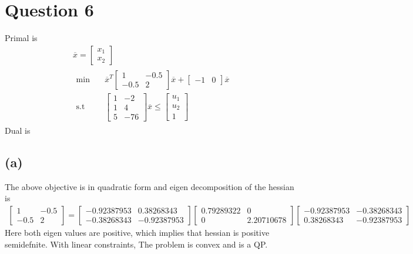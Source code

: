 \documentclass{article}
\begin{document}
\section*{\hfil Question 6}
Primal is
\begin{gather*}
	\overline{x} = \begin{bmatrix}
	x_1 \\
	x_2 
	\end{bmatrix}\\
	\begin{aligned}
		\min \quad & \overline{x}^T\begin{bmatrix}
		1 & -0.5\\
		-0.5 & 2
		\end{bmatrix}\overline{x} + \begin{bmatrix}
		-1 & 0
		\end{bmatrix}\overline{x}\\
		\textrm{s.t} \quad & \begin{bmatrix}
		1 & -2\\
		1 & 4\\
		5 & -76
		\end{bmatrix}\overline{x} \le \begin{bmatrix}
		u_1\\
		u_2\\
		1
		\end{bmatrix}
	\end{aligned}
\end{gather*}
Dual is 
\subsection*{(a)}
The above objective is in quadratic form and eigen decomposition of the hessian is
\begin{gather*}
	\begin{bmatrix}
		1 & -0.5\\
		-0.5 & 2
	\end{bmatrix} = \begin{bmatrix}
		-0.92387953 & 0.38268343\\
		-0.38268343 & -0.92387953
		\end{bmatrix}\begin{bmatrix}
		0.79289322 & 0\\
		0 & 2.20710678
		\end{bmatrix}\begin{bmatrix}
		-0.92387953 & -0.38268343\\
		0.38268343 & -0.92387953
		\end{bmatrix}
\end{gather*}
Here both eigen values are positive, which implies that hessian is positive semidefnite. With linear constraints, The problem is convex and is a QP.
\end{document}
